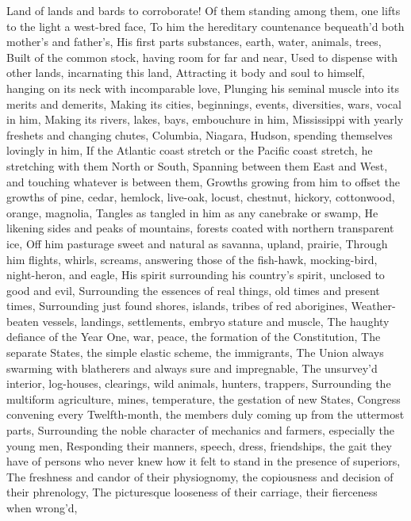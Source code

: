 \documentclass[11pt]{book}
\newenvironment {poem} [1]
 {\titulus{#1}%
  \versus
  \Nstanza{0}%
  \numerus{1}}
 {\endversus}
\begin{document}
\begin{poem}{By Blue Ontario's Shore}
Land of lands and bards to corroborate!
Of them standing among them, one lifts to the light a west-bred face,
To him the hereditary countenance bequeath'd both mother's and father's,
His first parts substances, earth, water, animals, trees,
Built of the common stock, having room for far and near,
Used to dispense with other lands, incarnating this land,
Attracting it body and soul to himself, hanging on its neck with %
    incomparable love,
Plunging his seminal muscle into its merits and demerits,
Making its cities, beginnings, events, diversities, wars, vocal in him,
Making its rivers, lakes, bays, embouchure in him,
Mississippi with yearly freshets and changing chutes, Columbia, %
    Niagara, Hudson, spending themselves lovingly in him,
If the Atlantic coast stretch or the Pacific coast stretch, he %
    stretching with them North or South,
Spanning between them East and West, and touching whatever is between them,
Growths growing from him to offset the growths of pine, ce\-dar, hemlock, %
    live-oak, locust, chestnut, hickory, cottonwood, orange, magnolia,
Tangles as tangled in him as any canebrake or swamp,
He likening sides and peaks of mountains, forests coated with %
    northern transparent ice,
Off him pasturage sweet and natural as savanna, upland, prai\-rie,
Through him flights, whirls, screams, answering those of the %
    fish-hawk, mocking-bird, night-heron, and eagle,
His spirit surrounding his country's spirit, unclosed to good and evil,
Surrounding the essences of real things, old times and present times,
Surrounding just found shores, islands, tribes of red aborigines,
Weather-beaten vessels, landings, settlements, embryo stature and muscle,
The haughty defiance of the Year One, war, peace, the formation of %
    the Constitution,
The separate States, the simple elastic scheme, the immigrants,
The Union always swarming with blatherers and always sure and impregnable,
The unsurvey'd interior, log-houses, clearings, wild animals, hunters, trappers,
Surrounding the multiform agriculture, mines, temperature, the %
    gestation of new States,
Congress convening every Twelfth-month, the members duly coming %
    up from the uttermost parts,
Surrounding the noble character of mechanics and farmers, especially %
    the young men,
Responding their manners, speech, dress, friendships, the gait they %
    have of persons who never knew how it felt to stand in the %
    presence of superiors,
The freshness and candor of their physiognomy, the copiousness and %
    decision of their phrenology,
The picturesque looseness of their carriage, their fierceness when wrong'd,

\end{poem}
\end{document}
